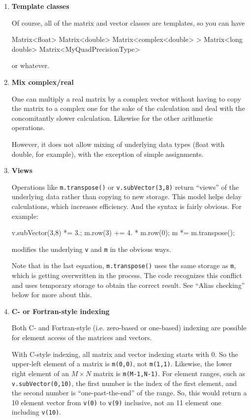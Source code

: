 \documentclass[twoside,letterpaper,11pt]{article}
\renewcommand{\tt}[1]{{\lstinline {#1}}}
\begin{document}
\begin{enumerate}
\item
\textbf{Template classes}

Of course, all of the matrix and vector classes are templates, so you can have 
\begin{tmvcode}
Matrix<float>
Matrix<double>
Matrix<complex<double> >
Matrix<long double>
Matrix<MyQuadPrecisionType>
\end{tmvcode}
or whatever.

\item
\textbf{Mix complex/real}

One can multiply a real matrix by a complex
vector without having to copy the matrix to a complex one for the sake of the calculation
and deal with the concomitantly slower calculation.  
Likewise for the other arithmetic operations.  

However, it does not allow mixing of underlying data types 
(float with double, for example), 
with the exception of simple assignments.

\item
\textbf{Views}

Operations like \tt{m.transpose()} or \tt{v.subVector(3,8)}
return ``views'' of the underlying data rather than copying to new storage.  
This model helps delay calculations, which increases efficiency.  And the syntax
is fairly obvious.  For example:
\begin{tmvcode}
v.subVector(3,8) *= 3.;
m.row(3) += 4. * m.row(0);
m *= m.transpose();
\end{tmvcode}
modifies the underlying \tt{v} and \tt{m} in the obvious ways.

Note that in the last equation, \tt{m.transpose()} uses the same storage as
\tt{m}, which is getting overwritten in the process.  The code recognizes 
this conflict and uses temporary storage to obtain the correct result.
See ``Alias checking'' below for more about this.

\item
\textbf{C- or Fortran-style indexing}

Both C- and Fortran-style (i.e. zero-based or one-based) indexing are possible for
element access of the matrices and vectors.

With C-style indexing, all matrix and vector indexing starts with 0.  
So the upper-left element of a matrix is \tt{m(0,0)}, not \tt{m(1,1)}. 
Likewise, the lower right element of an $M \times N$ matrix is \tt{m(M-1,N-1)}.
For element ranges, such as \tt{v.subVector(0,10)}, the first number is the 
index of the first element, and the second number is ``one-past-the-end'' of 
the range.  So, this would return a 10 element vector from \tt{v(0)} to
\tt{v(9)} inclusive, not an 11 element one including \tt{v(10)}.


\end{enumerate}
\end{document}
